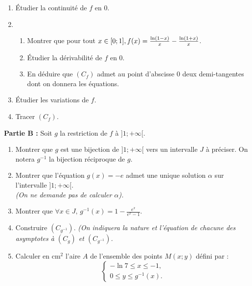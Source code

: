 \documentclass[12pt,a4paper]{article}
\begin{document}
\begin{multicols}{2}
        \begin{enumerate}
            \item Étudier la continuité de \( f \) en \( 0 \).
            \item
                  \begin{enumerate}
                      \item Montrer que pour tout \( x \in [0; 1],\\ f(x) = \frac{\ln(1 - x)}{x} - \frac{\ln(1 + x)}{x} \).
                      \item Étudier la dérivabilité de \( f \) en \( 0 \).
                      \item En déduire que \( (C_f) \) admet au point d’abscisse \( 0 \) deux demi-tangentes dont on donnera les équations.
                  \end{enumerate}
            \item Étudier les variations de \( f \).
            \item Tracer \( (C_f) \).
        \end{enumerate}
        \textbf{Partie B :} Soit \( g \) la restriction de \( f \) à \( ]1; +\infty[ \).
    \begin{enumerate}
        \item Montrer que \( g \) est une bijection de \( ]1; +\infty[ \) vers un intervalle \( J \) à préciser. On notera \( g^{-1} \) la bijection réciproque de \( g \).
        \item Montrer que l’équation \( g(x) = -e \) admet une unique solution \( \alpha \) sur l’intervalle \( ]1; +\infty[ \). \\
              \textit{(On ne demande pas de calculer \( \alpha \)).}
        \item Montrer que \( \forall x \in J, \, g^{-1}(x) = 1 - \frac{e^x}{e^x - 1}. \)
        \item Construire \( (C_{g^{-1}}) \). \textit{(On indiquera la nature et l’équation de chacune des asymptotes à \( (C_g) \) et \( (C_{g^{-1}}) \).}
        \item Calculer en \( \text{cm}^2 \) l’aire \( A \) de l’ensemble des points \( M(x; y) \) défini par :
              \[
                  \left\{
                  \begin{array}{ll}
                      -\ln 7 \leq x \leq -1, \\
                      0 \leq y \leq g^{-1}(x).
                  \end{array}
                  \right.
              \]
    \end{enumerate}
\end{multicols}
\end{document}
